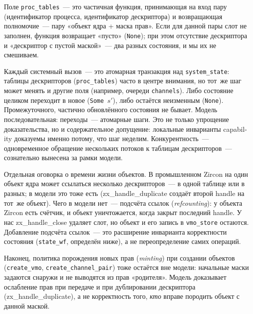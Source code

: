 \documentclass[11pt,a4paper]{article}
\newcommand{\isabel}[1]{{\isabelleit #1}}
\newcommand{\lemmaname}[1]{\isabel{#1}}
\begin{document}
Поле \texttt{proc\_tables}~--- это частичная функция, принимающая на
вход пару (идентификатор процесса, идентификатор дескриптора) и
возвращающая полномочие~--- пару «объект ядра + маска прав». Если для
данной пары слот не заполнен, функция возвращает «пусто»
(\texttt{None}); при этом отсутствие дескриптора и «дескриптор с
пустой маской»~--- два разных состояния, и мы их не смешиваем.

Каждый системный вызов~--- это атомарная транзакция над
\texttt{system\_state}: таблицы дескрипторов (\texttt{proc\_tables})
часто в центре внимания, но тот~же шаг может менять и другие поля
(например, очереди \texttt{channels}). Либо состояние целиком
переходит в новое (\texttt{Some~$s'$}), либо остаётся неизменным
(\texttt{None}). Промежуточного, частично обновлённого состояния не
бывает. Модель последовательная: переходы~---
атомарные шаги. Это не только упрощение доказательства, но и
содержательное допущение: локальные инварианты \textenglish{capability}
доказуемы именно потому, что шаг неделим. Конкурентность~---
одновременное обращение нескольких потоков к таблицам дескрипторов~---
сознательно вынесена за рамки модели.

Отдельная оговорка о времени жизни объектов. В промышленном Zircon
на один объект ядра может ссылаться несколько дескрипторов~--- в
одной таблице или в разных; в модели это тоже есть
(\lemmaname{zx\_handle\_duplicate} создаёт второй handle на тот~же
объект). Чего в модели нет~--- подсчёта ссылок (\emph{refcounting}):
у объекта Zircon есть счётчик, и объект уничтожается, когда закрыт
последний handle. У нас \lemmaname{zx\_handle\_close} удаляет слот, но
объект и его запись в \texttt{vmo\_store} остаются. Добавление подсчёта
ссылок~--- это расширение инварианта корректности состояния
(\texttt{state\_wf}, определён ниже), а не переопределение самих
операций.

Наконец, политика порождения новых прав (\emph{minting}) при создании
объектов (\texttt{create\_vmo}, \texttt{create\_channel\_pair}) тоже
остаётся вне модели: начальные маски задаются снаружи и не выводятся
из прав «родителя». Модель доказывает ослабление прав при передаче и
при дублировании дескриптора (\lemmaname{zx\_handle\_duplicate}), а не
корректность того, \emph{кто} вправе породить объект с данной маской.
\end{document}
